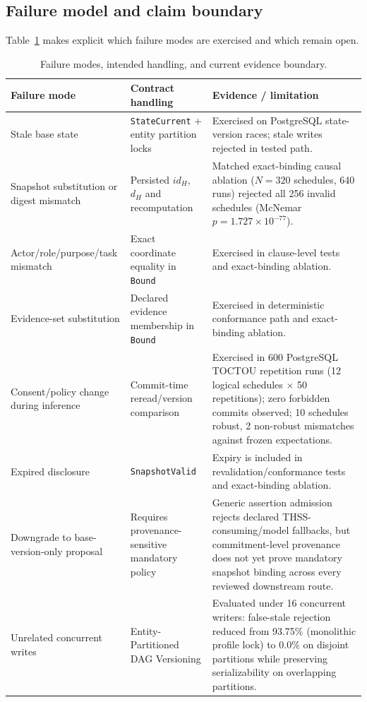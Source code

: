 \documentclass[11pt]{article}
\begin{document}
\subsection{Failure model and claim boundary}
Table~\ref{tab:failure} makes explicit which failure modes are exercised and which remain open.

\begin{table}[H]
\centering
\small
\caption{Failure modes, intended handling, and current evidence boundary.}
\label{tab:failure}
\begin{tabularx}{\textwidth}{>{\raggedright\arraybackslash}p{} >{\raggedright\arraybackslash}p{} X}
\toprule
\textbf{Failure mode} & \textbf{Contract handling} & \textbf{Evidence / limitation}\\
\midrule
Stale base state & \texttt{StateCurrent} + entity partition locks & Exercised on PostgreSQL state-version races; stale writes rejected in tested path.\\
Snapshot substitution or digest mismatch & Persisted $id_H$, $d_H$ and recomputation & Matched exact-binding causal ablation ($N=320$ schedules, 640 runs) rejected all 256 invalid schedules (McNemar $p=1.727\times 10^{-77}$).\\
Actor/role/purpose/task mismatch & Exact coordinate equality in \texttt{Bound} & Exercised in clause-level tests and exact-binding ablation.\\
Evidence-set substitution & Declared evidence membership in \texttt{Bound} & Exercised in deterministic conformance path and exact-binding ablation.\\
Consent/policy change during inference & Commit-time reread/version comparison & Exercised in 600 PostgreSQL TOCTOU repetition runs (12 logical schedules $\times$ 50 repetitions); zero forbidden commits observed; 10 schedules robust, 2 non-robust mismatches against frozen expectations.\\
Expired disclosure & \texttt{SnapshotValid} & Expiry is included in revalidation/conformance tests and exact-binding ablation.\\
Downgrade to base-version-only proposal & Requires provenance-sensitive mandatory policy & Generic assertion admission rejects declared THSS-consuming/model fallbacks, but commitment-level provenance does not yet prove mandatory snapshot binding across every reviewed downstream route.\\
Unrelated concurrent writes & Entity-Partitioned DAG Versioning & Evaluated under 16 concurrent writers: false-stale rejection reduced from 93.75\% (monolithic profile lock) to 0.0\% on disjoint partitions while preserving serializability on overlapping partitions.\\
\bottomrule
\end{tabularx}
\end{table}
\end{document}
